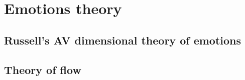 \chapter{Emotions theory}

\section{Russell's AV dimensional theory of emotions}

\section{Theory of flow}
